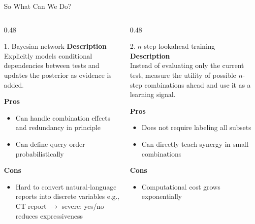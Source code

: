 \documentclass[
11pt,notheorems,hyperref={pdfauthor=whatever}
]{beamer}
\begin{document}
\begin{frame}{So What Can We Do?}
\vspace{0.25em}

\begin{columns}[T,onlytextwidth]
\begin{column}{0.48\textwidth}
\begin{block}{1. Bayesian network}
\small
\textbf{Description}\\
Explicitly models conditional dependencies between tests and updates the posterior as evidence is added.

\vspace{0.55em}
\textbf{Pros}
\begin{itemize}
  \item Can handle combination effects and redundancy in principle
  \item Can define query order probabilistically
\end{itemize}

\vspace{0.25em}
\textbf{Cons}
\begin{itemize}
  \item Hard to convert natural-language reports into discrete variables
  {\scriptsize e.g., CT report \(\rightarrow\) severe: yes/no reduces expressiveness}
\end{itemize}
\end{block}
\end{column}

\begin{column}{0.48\textwidth}
\begin{block}{2. \(n\)-step lookahead training}
\small
\textbf{Description}\\
Instead of evaluating only the current test, measure the utility of possible \(n\)-step combinations ahead and use it as a learning signal.

\vspace{0.45em}
\textbf{Pros}
\begin{itemize}
  \item Does not require labeling all subsets
  \item Can directly teach synergy in small combinations
\end{itemize}

\vspace{0.2em}
\textbf{Cons}
\begin{itemize}
  \item Computational cost grows exponentially
\end{itemize}


\end{block}
\end{column}
\end{columns}
\end{frame}
\end{document}
